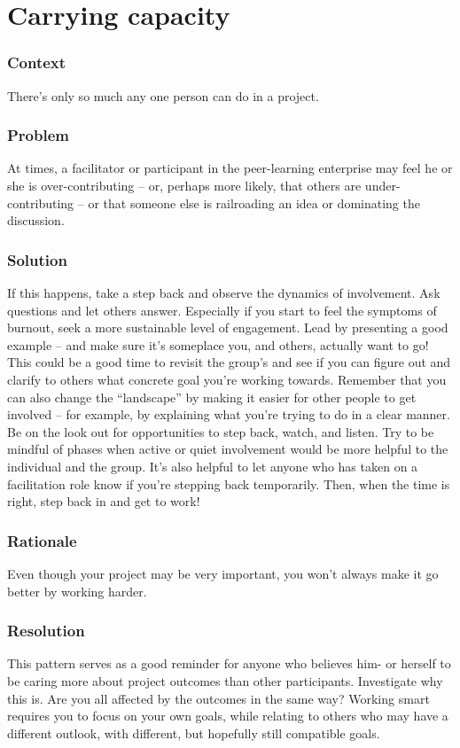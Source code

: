 \section{Carrying capacity}\label{sec:Carrying_capacity}
\subsubsection*{Context} There's only so much any one person can do in a project.

\subsubsection*{Problem} At times, a facilitator or participant in the
peer-learning enterprise may feel he or she is over-contributing -- or,
perhaps more likely, that others are under-contributing -- or that
someone else is railroading an idea or dominating the discussion.

\subsubsection*{Solution} If this happens, take a step back and observe the
dynamics of involvement. Ask questions and let others
answer. Especially if you start to feel the symptoms of burnout, seek
a more sustainable level of engagement.  Lead by presenting a good
example -- and make sure it's someplace you, and others, actually want
to go!  This could be a good time to revisit the group's
 and see if you can figure out and clarify to
others what concrete goal you're working towards. Remember that you
can also change the ``landscape'' by making it easier for other people
to get involved -- for example, by explaining what you're trying to do
in a clear manner.  Be on the look out for opportunities to step back,
watch, and listen.  Try to be mindful of phases when active or quiet
involvement would be more helpful to the individual and the group.
It's also helpful to let anyone who has taken on a facilitation role
know if you're stepping back temporarily.  Then, when the time is
right, step back in and get to work!

\subsubsection*{Rationale} Even though your project may be very important, you
won't always make it go better by working harder.


\subsubsection*{Resolution}
This pattern serves as a good reminder for anyone who believes him- or
herself to be caring more about project outcomes than other
participants.  Investigate why this is.  Are you all affected by the
outcomes in the same way?  Working smart requires you to focus on your
own goals, while relating to others who may have a different outlook,
with different, but hopefully still compatible goals.

